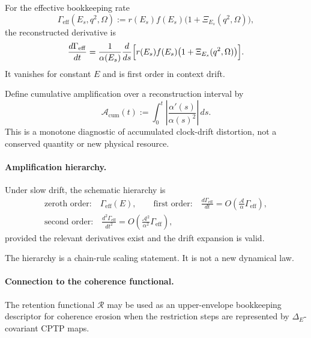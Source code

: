 \documentclass[aps,prx,onecolumn,11pt]{revtex4-2}
\theoremstyle{plain}
\theoremstyle{definition}
\theoremstyle{remark}
\begin{document}
For the effective bookkeeping rate
\begin{equation}
\Gamma_{\mathrm{eff}}(E_s,q^2,\Omega)
:=
r(E_s)f(E_s)
\bigl(1+\Xi_{E_s}(q^2,\Omega)\bigr),
\label{eq:toy_unified_gamma_eff_drift}
\end{equation}
the reconstructed derivative is
\begin{equation}
\frac{d\Gamma_{\mathrm{eff}}}{dt}
=
\frac{1}{\alpha(E_s)}
\frac{d}{ds}
\Bigl[
r(E_s)f(E_s)
\bigl(1+\Xi_{E_s}(q^2,\Omega)\bigr)
\Bigr].
\label{eq:toy_unified_gamma_drift}
\end{equation}
It vanishes for constant \(E\) and is first order in context drift.

Define cumulative amplification over a reconstruction interval by
\begin{equation}
\mathcal A_{\mathrm{cum}}(t)
:=
\int_0^t
\left|
\frac{\alpha'(s)}{\alpha(s)^2}
\right|\,ds.
\label{eq:toy_unified_amp_cumulative}
\end{equation}
This is a monotone diagnostic of accumulated clock-drift distortion,
not a conserved quantity or new physical resource.

\paragraph{Amplification hierarchy.}

Under slow drift, the schematic hierarchy is
\begin{equation}
\begin{gathered}
\text{zeroth order:}\quad
\Gamma_{\mathrm{eff}}(E),
\qquad
\text{first order:}\quad
\frac{d\Gamma_{\mathrm{eff}}}{dt}
=
O\!\left(
\frac{\mathcal A}{\alpha}
\Gamma_{\mathrm{eff}}
\right),
\\
\text{second order:}\quad
\frac{d^2\Gamma_{\mathrm{eff}}}{dt^2}
=
O\!\left(
\frac{\mathcal A^2}{\alpha^2}
\Gamma_{\mathrm{eff}}
\right),
\end{gathered}
\label{eq:toy_unified_amp_hierarchy}
\end{equation}
provided the relevant derivatives exist and the drift expansion is
valid.

The hierarchy is a chain-rule scaling statement. It is not a new
dynamical law.

\paragraph{Connection to the coherence functional.}

The retention functional \(\mathcal R\) may be used as an upper-envelope
bookkeeping descriptor for coherence erosion when the restriction steps
are represented by \(\Delta_E\)-covariant CPTP maps.
\end{document}
